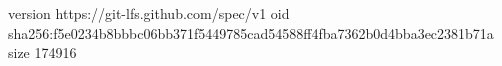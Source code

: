 version https://git-lfs.github.com/spec/v1
oid sha256:f5e0234b8bbbc06bb371f5449785cad54588ff4fba7362b0d4bba3ec2381b71a
size 174916
